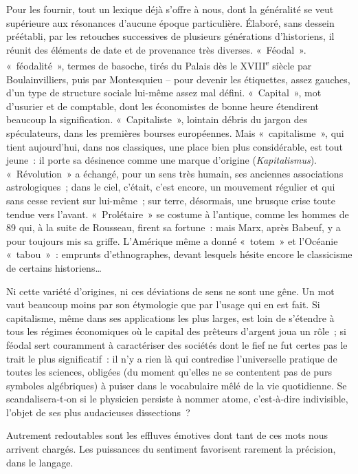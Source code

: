 \documentclass[french,twoside]{book} %
\newcommand{\astermono}{\medskip\centerline{\color{rubric}\large\selectfont{\syms ✻}}\medskip\par}%
\begin{document}
\astermono

\noindent Pour les fournir, tout un lexique déjà s’offre à nous, dont la généralité se veut supérieure aux résonances d’aucune époque particulière. Élaboré, sans dessein préétabli, par les retouches successives de plusieurs géné­rations d’historiens, il réunit des éléments de date et de provenance très diverses. « Féodal ». « féodalité », termes de basoche, tirés du Palais dès le XVIII\textsuperscript{e} siècle par Boulainvilliers, puis par Montesquieu – pour devenir les étiquettes, assez gauches, d’un type de structure sociale lui-même assez mal défini. « Capital », mot d’usurier et de comptable, dont les économistes de bonne heure étendirent beaucoup la signification. « Capi­taliste », lointain débris du jargon des spéculateurs, dans les premières bourses européennes. Mais « capitalisme », qui tient aujourd’hui, dans nos classiques, une place bien plus considérable, est tout jeune : il porte sa désinence comme une marque d’origine (\emph{Kapitalismus}). « Révolution » a échangé, pour un sens très humain, ses anciennes associations astrolo­giques ; dans le ciel, c’était, c’est encore, un mouvement régulier et qui sans cesse revient sur lui-même ; sur terre, désormais, une brusque crise toute tendue vers l’avant. « Prolétaire » se costume à l’antique, comme les hommes de 89 qui, à la suite de Rousseau, firent sa fortune : mais Marx, après Babeuf, y a pour toujours mis sa griffe. L’Amérique même a donné « totem » et l’Océanie « tabou » : emprunts d’ethnographes, devant lesquels hésite encore le classicisme de certains historiens…\par
Ni cette variété d’origines, ni ces déviations de sens ne sont une gêne. Un mot vaut beaucoup moins par son étymologie que par l’usage qui en est fait. Si capitalisme, même dans ses applications les plus larges, est loin de s’étendre à tous les régimes économiques où le capital des prêteurs d’argent joua un rôle ; si féodal sert couramment à caractériser des so­ciétés dont le fief ne fut certes pas le trait le plus significatif : il n’y a rien là qui contredise l’universelle pratique de toutes les sciences, obligées (du moment qu’elles ne se contentent pas de purs symboles algébriques) à puiser dans le vocabulaire mêlé de la vie quotidienne. Se scandalisera‑t‑on si le physicien persiste à nommer atome, c’est‑à‑dire indivisible, l’objet de ses plus audacieuses dissections ?\par
\label{p87} Autrement redoutables sont les effluves émotives dont tant de ces mots nous arrivent chargés. Les puissances du sentiment favorisent rare­ment la précision, dans le langage.\par
\end{document}
